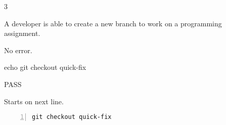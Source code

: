 \begin{description}[align=right,leftmargin=3.2cm,labelindent=3.0cm]
\item[Step:] 3
\item[Confirm:] A developer is able to create a new branch to work on a programming assignment.
\item[Expectation:] No error.
\item[Command:] echo git  checkout quick-fix
\item[Test Result:] PASS
\item[Evidence:] Starts on next line.
\end{description}
\begin{lstlisting}[numbers=left]
git checkout quick-fix

\end{lstlisting}
